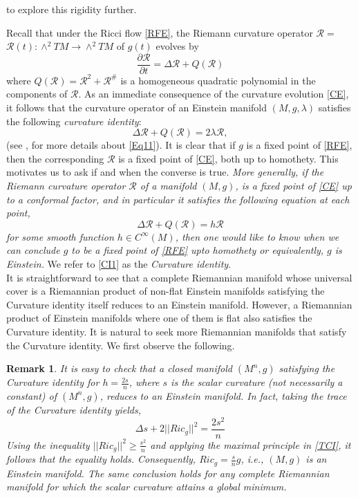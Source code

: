\documentclass[12pt]{amsart}
\newtheorem{rmk}{Remark}
\theoremstyle{definition}
\numberwithin{equation}{section}
\begin{document}
to explore this rigidity further.

Recall that under the Ricci flow \ref{RFE}, the Riemann curvature operator $\mathcal{R}=$ $\mathcal{R}(t): \wedge^2 T M \rightarrow \wedge^2 T M$ of $g(t)$ evolves by
\begin{equation} \label{CE}
\frac{\partial \mathcal{R}}{\partial t}=\Delta \mathcal{R} + Q(\mathcal{R})    
\end{equation}
where $Q(\mathcal{R})=\mathcal{R}^2+\mathcal{R}^{\#}$ is a homogeneous quadratic polynomial in the components of $\mathcal{R}$. As an immediate consequence of the curvature evolution \cref{CE}, it follows that the curvature operator of an Einstein manifold $(M,g,\lambda)$ satisfies the following \textit{curvature identity}:
\begin{equation}\label{Eq11}
\Delta \mathcal{R} + Q(\mathcal{R}) = 2\lambda \mathcal{R},
\end{equation} 
(see \cite{BCI}, \cite{PTLRF} for more details about \cref{Eq11}).
It is clear that if $g$ is a fixed point of \cref{RFE}, then the corresponding $\mathcal{R}$ is a fixed point of \cref{CE}, both up to homothety. This motivates us to ask if and when the converse is true. \textit{More generally, if the Riemann curvature operator $\mathcal{R}$ of a manifold $(M,g)$, is a fixed point of \cref{CE} up to a conformal factor, and in particular it satisfies the following equation at each point,
\begin{equation}\label{CI1}
\Delta \mathcal{R} + Q(\mathcal{R}) = h \mathcal{R}
\end{equation} 
for some smooth function $h \in C^{\infty}(M)$, then one would like to know when we can conclude $g$ to be a fixed point of \cref{RFE} upto homothety or equivalently, $g$ is Einstein.} We refer to \cref{CI1} as the \textit{Curvature identity}.\\ It is straightforward to see that a complete Riemannian manifold whose universal cover is a Riemannian product of non-flat Einstein manifolds satisfying the Curvature identity itself reduces to an Einstein manifold. However, a Riemannian product of Einstein manifolds where one of them is flat also satisfies the Curvature identity. It is natural to seek more Riemannian manifolds that satisfy the Curvature identity. We first observe the following.
\begin{rmk}\label{RS}
It is easy to check that a closed manifold $(M^{n},g)$ satisfying the Curvature identity for $h = \frac{2s}{n}$, where $s$ is the scalar curvature (not necessarily a constant) of $(M^{n},g)$, reduces to an Einstein manifold. In fact, taking the trace of the Curvature identity yields,
\begin{equation}\label{TCI}
\Delta s + 2||Ric_{g}||^{2} = \frac{2s^{2}}{n}
\end{equation}
Using the inequality $||Ric_{g}||^{2} \geq \frac{s^{2}}{n}$ and applying the maximal principle in \cref{TCI}, it follows that the equality holds. Consequently,  $Ric_{g} = \frac{s}{n}g$, i.e., $(M,g)$ is an Einstein manifold. The same conclusion holds for any complete Riemannian manifold for which the scalar curvature attains a global minimum.  
\end{rmk}
\end{document}
